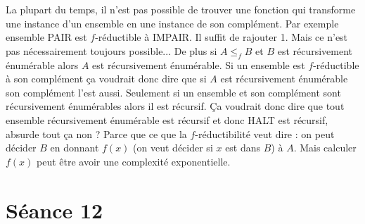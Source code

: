 \begin{mcqs}
  {La plupart du temps, il n'est pas possible de trouver une fonction qui transforme une instance d'un ensemble en une instance de son complément. Par exemple ensemble PAIR est $f$-réductible à IMPAIR. Il suffit de rajouter 1. Mais ce n'est pas nécessairement toujours possible...
  De plus si $A \leq_f B$ et $B$ est récursivement énumérable alors $A$ est récursivement énumérable.
  Si un ensemble est $f$-réductible à son complément ça voudrait donc dire que si $A$ est récursivement énumérable son complément l'est aussi.
  Seulement si un ensemble et son complément sont récursivement énumérables alors il est récursif.
  Ça voudrait donc dire que tout ensemble récursivement énumérable est récursif et donc HALT est récursif, absurde tout ça non ?}
  {Parce que ce que la $f$-réductibilité veut dire : on peut décider $B$ en donnant $f(x)$ (on veut décider si $x$ est dans $B$) à $A$.
  Mais calculer $f(x)$ peut être avoir une complexité exponentielle.}
\end{mcqs}

\section*{Séance 12}

